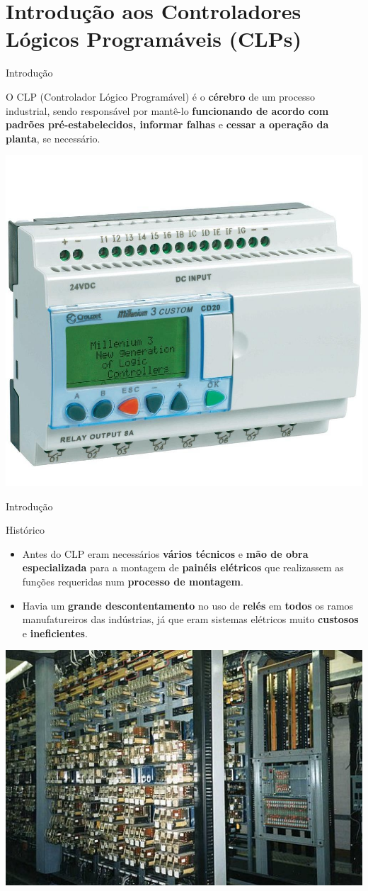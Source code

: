 \section{Introdução aos Controladores Lógicos Programáveis (CLPs)}

\begin{frame}{Introdução}
	\begin{block}{}
		O CLP (Controlador Lógico Programável) é o \textbf{cérebro} de um processo industrial, sendo responsável por mantê-lo \textbf{funcionando de acordo com padrões pré-estabelecidos, informar falhas} e \textbf{cessar a operação da planta}, se necessário.
	\end{block}

	\centering
	\includegraphics[width=0.5\linewidth]{Figuras/Ch08/fig1}

\end{frame}


\begin{frame}{Introdução}
	\begin{block}{Histórico}
		\begin{itemize}
			\item Antes do CLP eram necessários \textbf{vários técnicos} e \textbf{mão de obra especializada} para a montagem de \textbf{painéis elétricos} que realizassem as funções requeridas num \textbf{processo de montagem}.
			\item Havia um \textbf{grande descontentamento} no uso de \textbf{relés} em \textbf{todos} os ramos manufatureiros das indústrias, já que eram sistemas elétricos muito \textbf{custosos} e \textbf{ineficientes}.
		\end{itemize}
	\end{block}

	\centering
	\includegraphics[width=0.55\linewidth]{Figuras/Ch08/fig3}
\end{frame}


